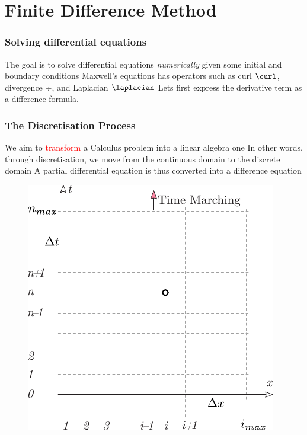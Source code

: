 \documentclass[10pt]{beamer}
\begin{document}
\section{Finite Difference Method}
\begin{frame}
    \frametitle{Solving differential equations}
    \begin{outline}
        \1 The goal is to solve differential equations \textit{numerically} given some initial and boundary conditions
        \1 Maxwell's equations has operators such as curl $\curl$, divergence $\div$, and Laplacian $\laplacian$
        \1 Lets first express the derivative term as a difference formula.
    \end{outline}

\end{frame}

\begin{frame}
    \frametitle{The Discretisation Process}

    \begin{outline}
        \1 We aim to \textcolor{red}{transform} a Calculus problem into a linear algebra one
        \1 In other words, through discretisation, we move from the continuous domain to the discrete domain
        \1 A partial differential equation is thus converted into a difference equation
    \end{outline}
    \begin{figure}[htbp]
        \centering
        \includegraphics[width=.45\textwidth]{time_marching.pdf}

    \end{figure}

\end{frame}
\end{document}
